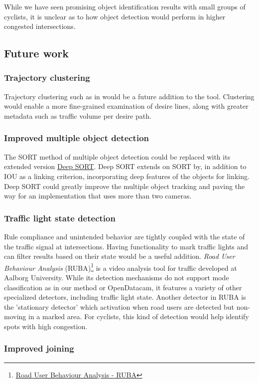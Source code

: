 While we have seen promising object identification results with small groups
of cyclists, it is unclear as to how object detection would perform in higher congested intersections. 
\ \\

\subsection{Future work}
\subsubsection{Trajectory clustering}
Trajectory clustering such as in \cite{gariel_trajectory_2011} would be a future addition to the tool.
Clustering would enable a more fine-grained examination of desire lines,
along with greater metadata such as traffic volume per desire path.

\subsubsection{Improved multiple object detection}
The SORT method of multiple object detection could be replaced with its extended version \href{https://github.com/nwojke/deep_sort}{Deep SORT}.
Deep SORT extends on SORT by, in addition to IOU as a linking criterion, incorporating
deep features of the objects for linking. Deep SORT could greatly improve the multiple object tracking
and paving the way for an implementation that uses more than two cameras.

\subsubsection{Traffic light state detection}
Rule compliance and unintended behavior are tightly coupled with the state of the traffic signal at intersections. 
Having functionality to mark traffic lights and can filter results based on their state would be a useful addition. 
\textit{Road User Behaviour Analysis} (RUBA)\footnote{\href{https://vbn.aau.dk/en/publications/the-ruba-watchdog-video-analysis-tool}{Road User Behaviour Analysis - RUBA}} 
is a video analysis tool for traffic developed at Aalborg University. While its detection mechanisms do not support mode classification
as in our method or OpenDatacam, it features a variety of other specialized detectors, including traffic light state. 
Another detector in RUBA is the 'stationary detector' which activation when road users are detected but non-moving in a marked area. 
For cyclists, this kind of detection would help identify spots with high congestion.

\subsubsection{Improved joining}